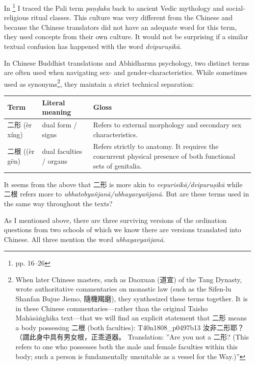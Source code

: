 In \cite{vimala2021}\footnote{\cite{vimala2021} pp. 16--26} I traced the Pali term \textit{paṇḍaka} back to ancient Vedic mythology and social-religious ritual classes. This culture was very different from the Chinese and because the Chinese translators did not have an adequate word for this term, they used concepts from their own culture. It would not be surprising if a similar textual confusion has happened with the word \textit{dvipuruṣikā}. 

In Chinese Buddhist translations and Abhidharma psychology, two distinct terms are often used when navigating sex- and gender-characteristics. While sometimes used as synonyms\footnote{When later Chinese masters, such as Daoxuan (道宣) of the Tang Dynasty, wrote authoritative commentaries on monastic law (such as the Sifen-lu Shanfan Bujue Jiemo, 隨機羯磨), they synthesized these terms together. It is in these Chinese commentaries—rather than the original Taisho Mahāsāṅghika text—that we will find an explicit statement that 二形 means a body possessing 二根 (both faculties):  T40n1808_p0497b13 汝非二形耶？（謂此身中具有男女根，正乖道器。 Translation: ''Are you not a 二形? (This refers to one who possesses both the male and female faculties within this body; such a person is fundamentally unsuitable as a vessel for the Way.)''}, they maintain a strict technical separation:

\begin{table}[htbp]
\centering
\small
\renewcommand{\arraystretch}{1.3}
\begin{tabularx}{\textwidth}{@{}l l >{\raggedright\arraybackslash}X@{}}
\toprule 
\textbf{Term} & \textbf{Literal meaning} & \textbf{Gloss} \\
\midrule
二形 (èr xíng) & dual form / signs &
  Refers to external morphology and secondary sex characteristics. \\
二根 ((èr gēn) & dual faculties / organs &
  Refers strictly to anatomy. It requires the concurrent physical presence of both functional sets of genitalia. \\
\bottomrule
\end{tabularx}
\end{table}

It seems from the above that 二形 is more akin to \textit{vepurisikā/dvipuruṣikā} while 二根 refers more to \textit{ubhatobyañjanā/ubhayavyañjanā}. But are these terms used in the same way throughout the texts?

As I mentioned above, there are three surviving versions of the ordination questions from two schools of which we know there are versions translated into Chinese. All three mention the word \textit{ubhayavyañjanā}. 


